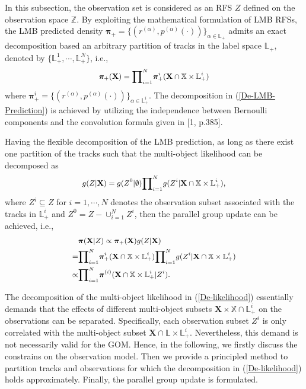 \documentclass[journal]{IEEEtran}
\newcommand{\bX}{{\mathbf X}}
\newcommand{\bpi}{{\boldsymbol\pi}}
\begin{document}
{In this subsection, the observation set is considered as an RFS $Z$ defined on the observation space $\mathbb{Z}$.  
By  exploiting the  mathematical formulation of LMB RFSs, the LMB predicted density $\bpi_+=\{(r^{(\alpha)},p^{(\alpha)}(\cdot))\}_{\alpha\in\mathbb{L}_+}$ admits an exact decomposition based  an arbitrary partition of tracks in the  label space $\mathbb{L}_{+}$, denoted by $\{\mathbb{L}_+^{1},\cdots, 
\mathbb{L}_+^{N}\}$, i.e.,
\begin{equation}\label{De-LMB-Prediction}
{\small
\begin{split}
\bpi_+(\bX)=
{\prod}_{i=1}^N\bpi^{i}_+(\bX\cap\mathbb{X}\times\mathbb{L}_+^{i})
\end{split}}
\end{equation}
where  $\bpi^{i}_+=\{(r^{(\alpha)},p^{(\alpha)}(\cdot))\}_{\alpha\in\mathbb{L}^{i}_+}$. The decomposition in (\ref{De-LMB-Prediction}) is achieved by utilizing the independence between  Bernoulli components and the convolution formula given in [1, p.385].


Having the flexible decomposition of the LMB prediction, as long as there exist one  partition of the tracks such that the multi-object likelihood can be decomposed as
\begin{equation}\label{De-likelihood}
{\small
\begin{split}
g(Z|\bX)= g(Z^{0}|\emptyset){\prod}_{i=1}^N g(Z^{i}|\bX\cap\mathbb{X}\times\mathbb{L}_+^{i}),
\end{split}}
\end{equation}
where $Z^{i}\subseteq Z$ for $i=1,\cdots, N$ denotes the observation subset associated with the tracks in $\mathbb{L}^{i}_{+}$ and $Z^0=Z-\cup_{i=1}^N Z^i$, then the parallel group update can be achieved, i.e., 
\begin{equation}\label{De-Posterior}
{\small
\begin{split}
&\bpi(\bX|Z)\propto\bpi_+(\bX)g(Z|\bX)
\\ =&{\prod}_{i=1}^N\bpi^{i}_+(\bX\cap\mathbb{X}\times\mathbb{L}_+^{i}) {\prod}_{i=1}^N g(Z^{i}|\bX\cap\mathbb{X}\times\mathbb{L}_+^{i})\\
\propto &{\prod}_{i=1}^N \bpi^{(i)}(\bX\cap\mathbb{X}\times\mathbb{L}_+^{i}|Z^{i}).
\end{split}}
\end{equation}

The decomposition of the multi-object likelihood  in (\ref{De-likelihood}) essentially demands that the effects of different multi-object subsets $\bX\times\mathbb{X}\cap\mathbb{L}_{+}^{i}$ on the observations can be separated. Specifically, each observation subset $Z^{i}$ is only correlated with the multi-object subset $\bX\cap\mathbb{L}\times\mathbb{L}_{+}^{i}$.
Nevertheless, this demand is not necessarily valid  for the GOM. Hence, in the following, we firstly discuss the constrains on the observation model. Then we provide a principled method to partition  tracks and observations for which the decomposition in (\ref{De-likelihood}) holds approximately. Finally, the parallel group update is formulated. 
}
\end{document}
